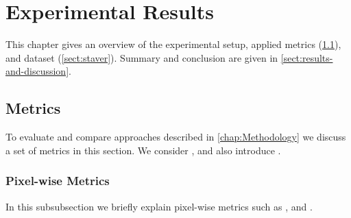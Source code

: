 \section{Experimental Results}
This chapter gives an overview of the experimental setup, applied metrics
(\cref{sect:metrics}), and dataset (\cref{sect:staver}). Summary and conclusion
are given in \cref{sect:results-and-discussion}.

\subsection{Metrics}\label{sect:metrics}
To evaluate and compare approaches described in \cref{chap:Methodology} we
discuss a set of metrics in this section. We consider
,  and also
introduce .

\subsubsection{Pixel-wise Metrics}\label{subsect:pixel-wise-metrics}
In this subsubsection we briefly explain pixel-wise metrics such as
,  and .

